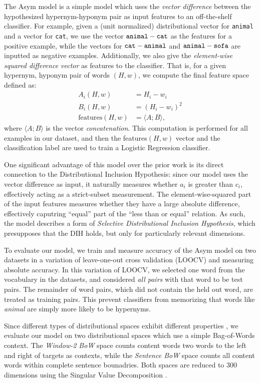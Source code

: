 \documentclass[12pt]{article}
\begin{document}
The Asym model is a simple model which uses the {\em vector difference} between
the hypothesized hypernym-hyponym pair as input features to an off-the-shelf
classifier. For example, given a (unit normalized) distributional vector for
{\tt animal} and a vector for {\tt cat}, we use the vector
${\tt animal} - {\tt cat}$ as the features for a positive example, while the
vectors for ${\tt cat} - {\tt animal}$ and ${\tt animal} - {\tt sofa}$ are
inputted as negative examples. Additionally, we also give the {\em element-wise
squared difference vector} as features to the classifier. That is, for a given
hypernym, hyponym pair of words $(H, w)$, we compute the final feature space
defined as:
\begin{align*}
  A_i(H, w) & = H_i - w_i\\
  B_i(H, w) & = (H_i - w_i)^2\\
  \text{features}(H, w) & = \langle A; B\rangle,
\end{align*}
where $\langle A; B\rangle$ is the vector {\em concatenation}. This computation
is performed for all examples in our dataset, and then the features$(H, w)$
vector and the classification label are used to train a Logistic Regression
classifier.

One significant advantage of this model over the prior work is its direct
connection to the Distributional Inclusion Hypothesis: since our model uses the
vector difference as input, it naturally measures whether $a_i$ is
greater than $c_i$, effectively acting as a strict-subset measurement. The
element-wise-squared part of the input features measures whether they have a
large absolute difference, effectively caputring ``equal'' part of the
``less than or equal'' relation. As such, the model describes a form of {\em
Selective Distributional Inclusion Hypothesis}, which presupposes that the DIH
holds, but only for particularly relevant dimensions.

To evaluate our model, we train and measure accuracy of the Asym model on
two datasets in a variation of leave-one-out cross validation (LOOCV) and
measuring absolute accuracy. In this variation of LOOCV, we selected one word
from the vocabulary in the datasets, and considered {\em all pairs} with that
word to be test pairs. The remainder of word pairs, which did not contain the
held out word, are treated as training pairs. This prevent classifiers from
memorizing that words like {\em animal} are simply more likely to be hypernyms.

Since different types of distributional spaces exhibit different properties
\cite{pado:2007:cl}, we evaluate our model on two distributional
spaces which use a simple Bag-of-Words context.  The {\em Window-2 BoW} space
counts content words two words to the left and right of targets as contexts,
while the {\em Sentence BoW} space counts all content words within complete
sentence bounadries. Both spaces are reduced to 300 dimensions using the
Singular Value Decomposition \cite{landauer:1997:pr}.
\end{document}
